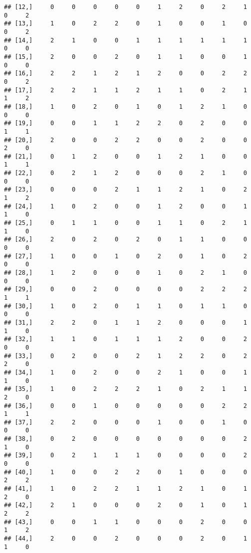\documentclass[
]{article}
\begin{document}
\begin{verbatim}
## [12,]     0     0     0     0     0     1     2     0     2     1     0     2
## [13,]     1     0     2     2     0     1     0     0     1     0     0     2
## [14,]     2     1     0     0     1     1     1     1     1     1     0     0
## [15,]     2     0     0     2     0     1     1     0     0     1     0     0
## [16,]     2     2     1     2     1     2     0     0     2     2     0     2
## [17,]     2     2     1     1     2     1     1     0     2     1     1     2
## [18,]     1     0     2     0     1     0     1     2     1     0     0     0
## [19,]     0     0     1     1     2     2     0     2     0     0     1     1
## [20,]     2     0     0     2     2     0     0     2     0     0     2     0
## [21,]     0     1     2     0     0     1     2     1     0     0     1     1
## [22,]     0     2     1     2     0     0     0     2     1     0     0     0
## [23,]     0     0     0     2     1     1     2     1     0     2     1     2
## [24,]     1     0     2     0     0     1     2     0     0     1     1     0
## [25,]     0     1     1     0     0     1     1     0     2     1     1     0
## [26,]     2     0     2     0     2     0     1     1     0     0     0     0
## [27,]     1     0     0     1     0     2     0     1     0     2     0     0
## [28,]     1     2     0     0     0     1     0     2     1     0     0     0
## [29,]     0     0     2     0     0     0     0     2     2     2     1     1
## [30,]     1     0     2     0     1     1     0     1     1     0     0     0
## [31,]     2     2     0     1     1     2     0     0     0     1     1     0
## [32,]     1     1     0     1     1     1     2     0     0     2     0     0
## [33,]     0     2     0     0     2     1     2     2     0     2     2     0
## [34,]     1     0     2     0     0     2     1     0     0     1     1     0
## [35,]     1     0     2     2     2     1     0     2     1     1     2     0
## [36,]     0     0     1     0     0     0     0     0     2     2     1     1
## [37,]     2     2     0     0     0     1     0     0     1     0     0     0
## [38,]     0     2     0     0     0     0     0     0     0     2     1     0
## [39,]     0     2     1     1     1     0     0     0     0     2     0     0
## [40,]     1     0     0     2     2     0     1     0     0     0     2     2
## [41,]     1     0     2     2     1     1     2     1     0     1     2     0
## [42,]     2     1     0     0     0     2     0     1     0     1     2     2
## [43,]     0     0     1     1     0     0     0     2     0     0     1     2
## [44,]     2     0     0     2     0     0     0     2     0     1     1     0

\end{verbatim}
\end{document}
